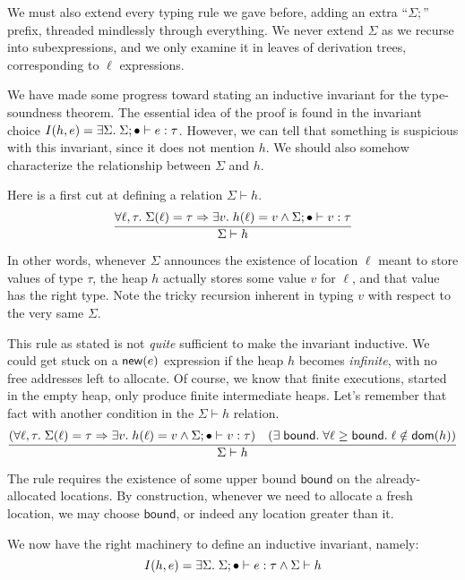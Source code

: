 \documentclass{amsbook}
\theoremstyle{definition}
\theoremstyle{remark}
\numberwithin{section}{chapter}
\numberwithin{equation}{chapter}
\begin{document}
We must also extend every typing rule we gave before, adding an extra ``$\Sigma;$'' prefix, threaded mindlessly through everything.
We never extend $\Sigma$ as we recurse into subexpressions, and we only examine it in leaves of derivation trees, corresponding to $\ell$ expressions.

We have made some progress toward stating an inductive invariant for the type-soundness theorem.
The essential idea of the proof is found in the invariant choice $I(h, e) = \exists \Sigma. \; \Sigma; \bullet \vdash e : \tau$.
However, we can tell that something is suspicious with this invariant, since it does not mention $h$.
We should also somehow characterize the relationship between $\Sigma$ and $h$.

\newcommand{\heapty}[2]{#1 \vdash #2}

Here is a first cut at defining a relation $\heapty{\Sigma}{h}$.
$$\infer{\heapty{\Sigma}{h}}{
  \forall \ell, \tau. \; \msel{\Sigma}{\ell} = \tau \Rightarrow \exists v. \; \msel{h}{\ell} = v \land \rhasty{\Sigma}{\mempty}{v}{\tau}
}$$

In other words, whenever $\Sigma$ announces the existence of location $\ell$ meant to store values of type $\tau$, the heap $h$ actually stores some value $v$ for $\ell$, and that value has the right type.
Note the tricky recursion inherent in typing $v$ with respect to the very same $\Sigma$.

This rule as stated is not \emph{quite} sufficient to make the invariant inductive.
We could get stuck on a $\mathsf{new}(e)$ expression if the heap $h$ becomes \emph{infinite}, with no free addresses left to allocate.
Of course, we know that finite executions, started in the empty heap, only produce finite intermediate heaps.
Let's remember that fact with another condition in the $\heapty{\Sigma}{h}$ relation.
$$\infer{\heapty{\Sigma}{h}}{
  (\forall \ell, \tau. \; \msel{\Sigma}{\ell} = \tau \Rightarrow \exists v. \; \msel{h}{\ell} = v \land \rhasty{\Sigma}{\mempty}{v}{\tau})
  & (\exists \; \mathsf{bound}. \; \forall \ell \geq \mathsf{bound}. \; \ell \notin \dom{h})
}$$

The rule requires the existence of some upper bound $\mathsf{bound}$ on the already-allocated locations.
By construction, whenever we need to allocate a fresh location, we may choose $\mathsf{bound}$, or indeed any location greater than it.

We now have the right machinery to define an inductive invariant, namely:
\invariants
$$I(h, e) = \exists \Sigma. \; \rhasty{\Sigma}{\mempty}{e}{\tau} \land \heapty{\Sigma}{h}$$
\end{document}
